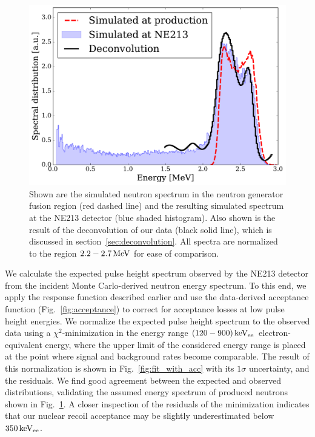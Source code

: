 \begin{figure}[!htbp]
\centering
    \includegraphics[width=\linewidth]{figures/ng/mc_spectrum}
    \caption{Shown are the simulated neutron spectrum in the neutron generator fusion region (red dashed line) and the resulting simulated spectrum at the NE213 detector (blue shaded histogram). Also shown is the result of the deconvolution of our data (black solid line), which is discussed in section~\ref{sec:deconvolution}. All spectra are normalized to the region $2.2 - 2.7\,\mathrm{MeV}$ for ease of comparison.}\label{fig:incident_spectrum}
\end{figure}

We calculate the expected pulse height spectrum observed by the NE213 detector from the incident Monte Carlo-derived neutron energy spectrum. To this end, we apply the response function described earlier and use the data-derived acceptance function (Fig.~\ref{fig:acceptance}) to correct for acceptance losses at low pulse height energies. We normalize the expected pulse height spectrum to the observed data using a $\chi^2$-minimization in the energy range $(120-900)\,\mathrm{keV_{ee}}$ electron-equivalent energy, where the upper limit of the considered energy range is placed at the point where signal and background rates become comparable. The result of this normalization is shown in Fig.~\ref{fig:fit_with_acc} with its $1\sigma$ uncertainty, and the residuals. We find good agreement between the expected and observed distributions, validating the assumed energy spectrum of produced neutrons shown in Fig.~\ref{fig:incident_spectrum}. A closer inspection of the residuals of the minimization indicates that our nuclear recoil acceptance may be slightly underestimated below $350\,\mathrm{keV_{ee}}$.

